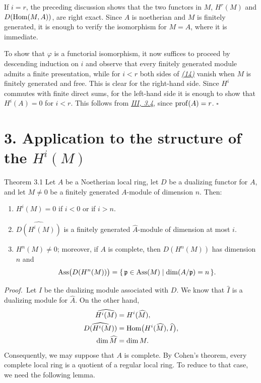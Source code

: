 If $i=r$, the preceding discussion shows that the two functors in $M$,
$H^r(M)$ and $D(\operatorname{Hom}(M,A))$, are right exact. Since $A$ is noetherian
and $M$ is finitely generated, it is enough to verify the isomorphism for
$M=A$, where it is immediate.

To show that $\varphi$ is a functorial isomorphism, it now suffices to
proceed by descending induction on $i$ and observe that every finitely
generated module admits a finite presentation, while for $i<r$ both sides
of \emph{\hyperref[eq:V.14]{(14)}} vanish when $M$ is finitely generated and free. This is
clear for the right-hand side. Since $H^i$ commutes with finite direct sums,
for the left-hand side it is enough to show that $H^i(A)=0$ for $i<r$.
This follows from \emph{\hyperref[III.3.4]{III, 3.4}}, since $\operatorname{prof}(A)=r$. \hfill$\square$

\section*{3. Application to the structure of the $H^i(M)$}

\begin{sgatheorem}{Theorem 3.1}
Let $A$ be a Noetherian local ring, let $D$ be a dualizing functor for $A$,
and let $M\ne 0$ be a finitely generated $A$-module of dimension $n$.
Then:
\begin{enumerate}
  \item[(i)] $H^i(M)=0$ if $i<0$ or if $i>n$.

  \item[(ii)] $\widehat{D(H^i(M))}$ is a finitely generated
  $\widehat A$-module of dimension at most $i$.

  \item[(iii)] $H^n(M)\ne 0$; moreover, if $A$ is complete, then
  $D(H^n(M))$ has dimension $n$ and
  \[
    \operatorname{Ass}\bigl(D(H^n(M))\bigr)
      =\{\,\mathfrak p\in\operatorname{Ass}(M)\mid \dim(A/\mathfrak p)=n\,\}.
  \]
\end{enumerate}
\end{sgatheorem}

\par{}\noindent\textit{Proof.}\ 
Let $I$ be the dualizing module associated with $D$. We know that
$\widehat I$ is a dualizing module for $\widehat A$. On the other hand,
\begin{align*}
  \widehat{H^i(M)}&=H^i(\widehat M),\\
  \widehat{D(H^i(M))}&=\operatorname{Hom}\bigl(H^i(\widehat M),\widehat I\bigr),\\
  \dim\widehat M&=\dim M.
\end{align*}
Consequently, we may suppose that $A$ is complete. By Cohen's
theorem, every complete local ring is a quotient of a regular local ring.
To reduce to that case, we need the following lemma.

